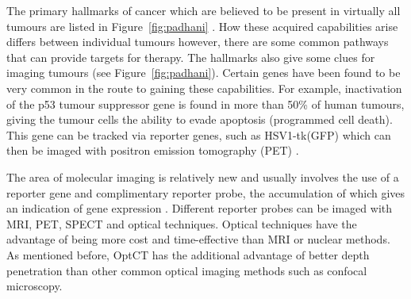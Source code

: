 \documentclass[12pt]{article}
\begin{document}




The primary hallmarks of cancer which are believed to be present in virtually all tumours are listed in Figure~\ref{fig:padhani} \cite{Hanahan:2000}. How these acquired capabilities arise differs between individual tumours however, there are some common pathways that can provide targets for therapy. The hallmarks also give some clues for imaging tumours (see Figure~\ref{fig:padhani}). Certain genes have been found to be very common in the route to gaining these capabilities. For example, inactivation of the p53 tumour suppressor gene is found in more than 50\% of  human tumours, giving the tumour cells the ability to evade apoptosis (programmed cell death). This gene can be tracked via reporter genes, such as HSV1-tk(GFP) which can then be imaged with positron emission tomography (PET) \cite{Doubrovin:2001}.  

The area of molecular imaging is relatively new and usually involves the use of a reporter gene and complimentary reporter probe, the accumulation of which gives an indication of gene expression \cite{Blasberg:2003}. Different reporter probes can be imaged with MRI, PET, SPECT and optical techniques. Optical techniques have the advantage of being more cost and time-effective than MRI or nuclear methods. As mentioned before, OptCT has the additional advantage of better depth penetration than other common optical imaging methods such as confocal microscopy.
\end{document}
